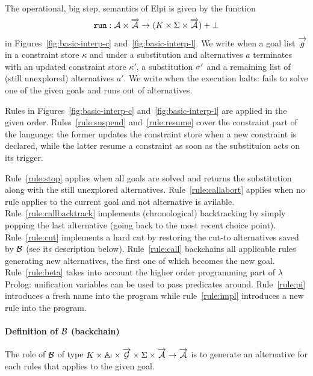 \documentclass[a4paper, 11pt]{book}
\begin{document}
The operational, big step, semantics of Elpi is given by the function
$$
\run{} : \alt \times \vecL{\alt} \to (K  \times \Sigma \times \vecL{\alt}) + \bot
$$
in Figures~\ref{fig:basic-interp-c} and~\ref{fig:basic-interp-l}.
We write 
when a goal list $\vecL{g}$ in a constraint store $\kappa$ and under a substitution \subst and alternatives $a$
terminates with an updated constraint store $\kappa'$, a substitution $\sigma'$ and a remaining list of
(still unexplored) alternatives $a'$. We write  
when the execution halts: fails to solve one of the given goals and runs out of
alternatives. 

Rules in Figures~\ref{fig:basic-interp-c} and~\ref{fig:basic-interp-l}
are applied in the given order. Rules~\ref{rule:suspend} and~\ref{rule:resume}
cover the constraint part of the language: the former updates the constraint
store when a new constraint is declared, while the latter resume a constraint
as soon as the substituion \subst acts on its trigger.

Rule~\ref{rule:stop} applies when all goals are solved and returns
the substitution along with the still unexplored alternatives.
Rule~\ref{rule:callabort} applies when no rule applies to the
current goal and not alternative is avilable.
Rule~\ref{rule:callbacktrack} implements (chronological) backtracking by simply
popping the last alternative (going back to the most recent choice point).
Rule~\ref{rule:cut} implements a hard cut by restoring the cut-to alternatives
saved by $\mathcal{B}$ (see its description below).
Rule~\ref{rule:call} backchains all applicable rules generating new
alternatives, the first one of which becomes the new goal.
Rule~\ref{rule:beta} takes into account the higher order programming part
of $\lambda$Prolog: unification variables can be used to pass
predicates around.
Rule~\ref{rule:pi} introduces a fresh name into the program
while rule~\ref{rule:impl} introduces a new rule into the program.

\paragraph{Definition of $\mathcal{B}$ (backchain)}

The role of $\mathcal{B}$ of type $K \times \APP \times \vecL{\g} \times \Sigma \times \vecL{\alt} \to \vecL{\alt}$ is to generate
an alternative for each rules that applies to the given goal.
\end{document}
